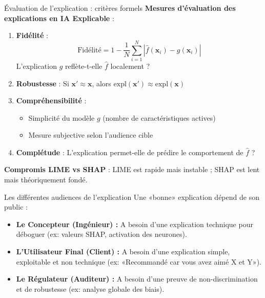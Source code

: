 \documentclass[9pt, aspectratio=169]{beamer}
\begin{document}
\begin{frame}{Évaluation de l'explication : critères formels}
    \textbf{Mesures d'évaluation des explications en IA Explicable} :
    
    \vspace{0.3cm}
    \begin{enumerate}
        \item \textbf{Fidélité} : 
        \[
        \text{Fidélité} = 1 - \frac{1}{N}\sum_{i=1}^{N}|\hat{f}(\mathbf{x}_i) - g(\mathbf{x}_i)|
        \]
        L'explication \(g\) reflète-t-elle \(\hat{f}\) localement ?
        
        \item \textbf{Robustesse} : Si \(\mathbf{x}' \approx \mathbf{x}\), alors \(\text{expl}(\mathbf{x}') \approx \text{expl}(\mathbf{x})\)
        
        \item \textbf{Compréhensibilité} : 
        \begin{itemize}
            \item Simplicité du modèle \(g\) (nombre de caractéristiques actives)
            \item Mesure subjective selon l'audience cible
        \end{itemize}
        
        \item \textbf{Complétude} : L'explication permet-elle de prédire le comportement de \(\hat{f}\) ?
    \end{enumerate}
    
    \vspace{0.2cm}
    \textbf{Compromis LIME vs SHAP} : LIME est rapide mais instable ; SHAP est lent mais théoriquement fondé.
\end{frame}

\begin{frame}{Les différentes audiences de l'explication}
    Une «bonne» explication dépend de son public \parencite{Doran2017} :
    \begin{itemize}
        \item \textbf{Le Concepteur (Ingénieur) :} A besoin d'une explication technique pour déboguer (ex: valeurs SHAP, activation des neurones).
        \item \textbf{L'Utilisateur Final (Client) :} A besoin d'une explication simple, exploitable et non technique (ex: «Recommandé car vous avez aimé X et Y»).
        \item \textbf{Le Régulateur (Auditeur) :} A besoin d'une preuve de non-discrimination et de robustesse (ex: analyse globale des biais).
    \end{itemize}
\end{frame}
\end{document}
